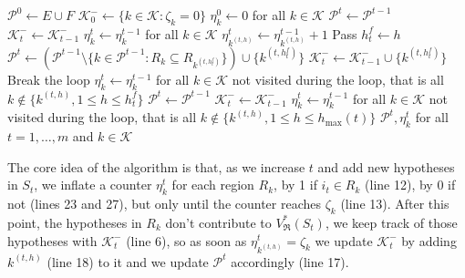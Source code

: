 \documentclass[
  11pt,
  a4paper,
]{article}
\theoremstyle{plain}
\theoremstyle{definition}
\theoremstyle{plain}
\theoremstyle{definition}
\theoremstyle{plain}
\theoremstyle{remark}
\begin{document}
\begin{algorithm}[htb!]
\caption{\label{algo-formal-curve}Formal computation of $(V^*_{\mathfrak{R}}(S_t))_{0\leq t\leq m}$ with a complete family}
\begin{algorithmic}[1]
  \State $\mathcal{P}^0\gets E\cup F$  
  \State $\mathcal{K}^-_0\gets\{k\in\mathcal{K} : \zeta_k=0  \}$
  \State $\eta^0_k\gets0$ for all $k\in\mathcal{K}$
      \State $\mathcal{P}^t \gets \mathcal{P}^{t-1}$
      \State $\mathcal{K}^-_t \gets \mathcal{K}^-_{t-1}$
      \State $\eta^t_k\gets\eta^{t-1}_k$ for all $k\in\mathcal{K}$
    \Else
        \State $\eta^t_{k^{(t,h)}}\gets\eta^{t-1}_{k^{(t,h)}} + 1$
          \State Pass
        \Else
          \State $h^f_t \gets h$ 
          \State $\mathcal{P}^t \gets\left( \mathcal{P}^{t-1}\setminus \{ k\in \mathcal{P}^{t-1} : R_k\subseteq R_{k^{(t,h^f_t)}} \}\right)\cup \{ k^{(t,h^f_t)} \}$
          \State $\mathcal{K}^-_t \gets \mathcal{K}^-_{t-1} \cup \{k^{(t,h^f_t)}\}$
          \State Break the loop
        \EndIf
      \EndFor
        \State $\eta^t_k\gets\eta^{t-1}_k$ for all $k\in\mathcal{K}$ not visited during the loop, that is all $k\not\in\{k^{(t,h)}, 1\leq h\leq h^f_t   \}$
      \Else
        \State $\mathcal{P}^t \gets \mathcal{P}^{t-1}$
        \State $\mathcal{K}^-_t \gets \mathcal{K}^-_{t-1}$
        \State $\eta^t_k\gets\eta^{t-1}_k$ for all $k\in\mathcal{K}$ not visited during the loop, that is all $k\not\in\{k^{(t,h)}, 1\leq h\leq h_{\max}(t)   \}$
      \EndIf
    \EndIf
  \EndFor
  \State\Return $\mathcal{P}^t, \eta^t_k$ for all $t=1,\dotsc, m$ and $k\in\mathcal{K}$
\EndProcedure
\end{algorithmic}
\end{algorithm}

The core idea of the algorithm is that, as we increase \(t\) and add new
hypotheses in \(S_t\), we inflate a counter \(\eta_k^t\) for each region
\(R_k\), by 1 if \(i_t\in R_k\) (line 12), by 0 if not (lines 23 and
27), but only until the counter reaches \(\zeta_k\) (line 13). After
this point, the hypotheses in \(R_k\) don't contribute to
\(V^*_{\mathfrak{R}}(S_t)\), we keep track of those hypotheses with
\(\mathcal{K}^-_t\) (line 6), so as soon as
\(\eta^t_{k^{(t,h)}}=\zeta_k\) we update \(\mathcal{K}^-_t\) by adding
\(k^{(t,h)}\) (line 18) to it and we update \(\mathcal{P}^t\)
accordingly (line 17).
\end{document}
